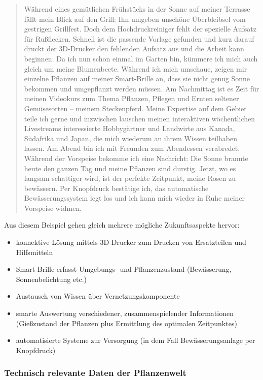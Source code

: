 \begin{quote}
Während eines gemütlichen Frühstücks in der Sonne auf meiner Terrasse
fällt mein Blick auf den Grill: Ihn umgeben unschöne Überbleibsel vom
gestrigen Grillfest. Doch dem Hochdruckreiniger fehlt der spezielle
Aufsatz für Rußflecken. Schnell ist die passende Vorlage gefunden und
kurz darauf druckt der 3D-Drucker den fehlenden Aufsatz aus und die
Arbeit kann beginnen. Da ich nun schon einmal im Garten bin, kümmere ich
mich auch gleich um meine Blumenbeete. Während ich mich umschaue, zeigen
mir einzelne Pflanzen auf meiner Smart-Brille an, dass sie nicht genug
Sonne bekommen und umgepflanzt werden müssen. Am Nachmittag ist es Zeit
für meinen Videokurs zum Thema Pflanzen, Pflegen und Ernten seltener
Gemüsesorten -- meinem Steckenpferd. Meine Expertise auf dem Gebiet
teile ich gerne und inzwischen lauschen meinen interaktiven
wöchentlichen Livestreams interessierte Hobbygärtner und Landwirte aus
Kanada, Südafrika und Japan, die mich wiederum an ihrem Wissen teilhaben
lassen. Am Abend bin ich mit Freunden zum Abendessen verabredet. Während
der Vorspeise bekomme ich eine Nachricht: Die Sonne brannte heute den
ganzen Tag und meine Pflanzen sind durstig. Jetzt, wo es langsam
schattiger wird, ist der perfekte Zeitpunkt, meine Rosen zu bewässern.
Per Knopfdruck bestätige ich, das automatische Bewässerungssystem legt
los und ich kann mich wieder in Ruhe meiner Vorspeise widmen.
\end{quote}

Aus diesem Beispiel gehen gleich mehrere mögliche Zukunftsaspekte
hervor:

\begin{itemize}
\tightlist
\item
  konnektive Lösung mittels 3D Drucker zum Drucken von Ersatzteilen und
  Hilfsmitteln
\item
  Smart-Brille erfasst Umgebungs- und Pflanzenzustand (Bewässerung,
  Sonnenbelichtung etc.)
\item
  Austausch von Wissen über Vernetzungskomponente
\item
  smarte Auswertung verschiedener, zusammenspielender Informationen
  (Gießzustand der Pflanzen plus Ermittlung des optimalen Zeitpunktes)
\item
  automatisierte Systeme zur Versorgung (in dem Fall Bewässerungsanlage
  per Knopfdruck)
\end{itemize}

\hypertarget{technisch-relevante-daten-der-pflanzenwelt}{%
\subsubsection{Technisch relevante Daten der
Pflanzenwelt}\label{technisch-relevante-daten-der-pflanzenwelt}}

